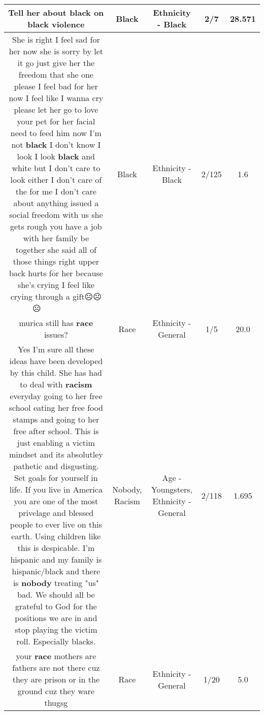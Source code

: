 \documentclass[11pt]{article}
\newlength\mylength
\begin{document}
\begin{center}
\begin{longtable}{|C{.65\mylength}|C{.30\mylength}|C{.12\mylength}|C{.12\mylength}|C{.12\mylength}|}
  \small Tell her about \textbf{black} on \textbf{black} violence\normalsize   & Black & Ethnicity - Black & 2/7 & 28.571 \\  \hline
  \small She is right I feel sad for her now she is sorry by let it go just give her the freedom that she one please I feel bad for her now I feel like I wanna cry please let her go to love your pet for her facial need to feed him now I'm not \textbf{black} I don't know I look I look \textbf{black} and white but I don't care to look either I don't care of the for me I don't care about anything issued a social freedom with us she gets rough you have a job with her family be together she said all of those things right upper back hurts for her because she's crying I feel like crying through a gift☹️☹️☹️🤧👏🏼👏🏼👏🏼🙏🙏👨🏿👱🏿‍♂️🧒👨‍👧\normalsize   & Black & Ethnicity - Black & 2/125 & 1.6 \\  \hline
  \small murica still has \textbf{race} issues?\normalsize   & Race & Ethnicity - General & 1/5 & 20.0 \\  \hline
  \small Yes I'm sure all these ideas have been developed by this child. She has had to deal with \textbf{racism} everyday going to her free school eating her free food stamps and going to her free after school. This is just enabling a victim mindset and its absolutley pathetic and disgusting. Set goals for yourself in life.  If you live in America you are one of the most privelage and blessed people to ever live on this earth. Using children like this is despicable. I'm hispanic and my family is hispanic/black and there is \textbf{nobody} treating "us" bad. We should all be grateful to God for the positions we are in and stop playing the victim roll. Especially blacks.\normalsize   & Nobody, Racism & Age - Youngsters, Ethnicity - General & 2/118 & 1.695 \\  \hline
  \small your \textbf{race} mothers are fathers are not there cuz they are prison or in the ground cuz they ware thugsg\normalsize   & Race & Ethnicity - General & 1/20 & 5.0 \\  \hline

\end{longtable}
\end{center}
\end{document}

